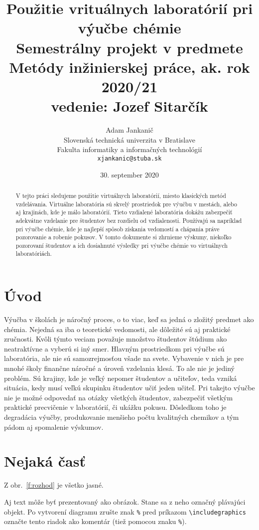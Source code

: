 \documentclass[10pt,twoside,slovak,a4paper]{article}
\title{Použitie vrituálnych laboratórií pri výučbe chémie \\
 
 {\normalsize Semestrálny projekt v predmete Metódy inžinierskej práce, ak. rok 2020/21\\
 \normalsize vedenie: Jozef  Sitarčík}} %
\author{Adam Jankanič\\[2pt]
	{\small Slovenská technická univerzita v Bratislave}\\
	{\small Fakulta informatiky a informačných technológií}\\
	{\small \texttt{xjankanic@stuba.sk}}
	}
\date{\small 30. september 2020} %
\begin{document}
\maketitle

\begin{abstract}
V tejto práci sledujeme použitie virtuálnych laboratórií, miesto klasických metód vzdelávania. 
Virtuálne laboratória sú skvelý prostriedok pre výučbu v mestách, alebo aj krajinách, kde je málo laboratórií. 
Tieto vzdialené laboratória dokážu zabezpečiť adekvátne vzdelanie pre študentov bez rozdielu od vzdialenosti. 
Používajú sa napríklad pri výučbe chémie, kde je najlepší spôsob získania vedomostí a chápania práve pozorovanie a robenie pokusov. 
V tomto dokumente si zhrnieme výskumy, niekoľko pozorovaní študentov a ich dosiahnuté výsledky pri výučbe chémie vo virtuálnych laboratóriách.
\end{abstract}



\section{Úvod}

Výučba v školách je náročný proces, o to viac, keď sa jedná o zložitý predmet ako chémia. Nejedná sa iba o teoretické vedomosti, ale dôležité sú aj praktické zručnosti. Kvôli týmto veciam považuje množstvo študentov štúdium ako neatraktívne a vyberú si iný smer. Hlavným prostriedkom pri výučbe sú laboratória, ale nie sú samozrejmosťou všade na svete. Vybavenie v nich je pre mnohé školy finančne náročné a úroveň vzdelania klesá. To ale nie je jediný problém. Sú krajiny, kde je veľký nepomer študentov a učiteľov, teda vzniká situácia, kedy musí veľkú skupinku študentov učiť jeden učiteľ. Pri takejto výučbe nie je možné odpovedať na otázky všetkých študentov, zabezpečiť všetkým praktické precvičenie v laboratórií, či  ukážku pokusu. Dôsledkom toho je degradácia výučby, produkovanie menšieho počtu kvalitných chemikov a tým pádom aj spomalenie výskumov.


\section{Nejaká časť} \label{nejaka}

Z obr.~\ref{f:rozhod} je všetko jasné. 

\begin{figure*}[tbh]
\centering
Aj text môže byť prezentovaný ako obrázok. Stane sa z neho označný plávajúci objekt. Po vytvorení diagramu zrušte znak \texttt{\%} pred príkazom \verb|\includegraphics| označte tento riadok ako komentár (tiež pomocou znaku \texttt{\%}).
\caption{Rozhodujúci argument.}
\label{f:rozhod}
\end{figure*}
\end{document}
